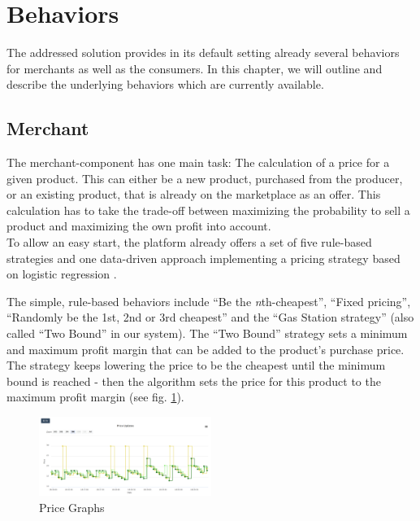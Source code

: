 \section{Behaviors}
\label{sec:Behaviors}
%
The addressed solution provides in its default setting already several behaviors for merchants as well as the consumers. In this chapter, we will outline and describe the underlying behaviors which are currently available.

\subsection{Merchant}
\label{sec:Behaviors_Merchants}
%
The merchant-component has one main task: The calculation of a price for a given product. This can either be a new product, purchased from the producer, or an existing product, that is already on the marketplace as an offer. This calculation has to take the trade-off between maximizing the probability to sell a product and maximizing the own profit into account. \\

To allow an easy start, the platform already offers a set of five rule-based strategies and one data-driven approach implementing a pricing strategy based on logistic regression \citep{hosmer2013applied}.

The simple, rule-based behaviors include ``Be the \textit{n}th-cheapest'', ``Fixed pricing'', ``Randomly be the 1st, 2nd or 3rd cheapest'' and the ``Gas Station strategy'' (also called ``Two Bound'' in our system). The ``Two Bound'' strategy sets a minimum and maximum profit margin that can be added to the product's purchase price. The strategy keeps lowering the price to be the cheapest until the minimum bound is reached - then the algorithm sets the price for this product to the maximum profit margin (see fig. \ref{fig:price_graphs_v2}). \\

%
\begin{figure}[h]
    \centering
    \includegraphics[width=0.5\textwidth]{images/price_graphs_v2.png}
    \caption{Price Graphs}
    \label{fig:price_graphs_v2}
\end{figure}
%

